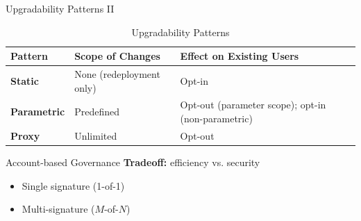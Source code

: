 \documentclass[]{beamer}
\begin{document}
\begin{frame}{Upgradability Patterns II}

	\vspace{1.5em}

	{\small
		\begin{table}[h]
			\centering
			\begin{tabular}{p{1.8cm}p{4cm}p{4.5cm}}
			\hline
			\hline
			\textbf{Pattern} & \textbf{Scope of Changes} & \textbf{Effect on Existing Users} \\
			\hline
			\textbf{Static} & None (redeployment only) & Opt-in \\
			\hline
			\textbf{Parametric} & Predefined & Opt-out (parameter scope); opt-in (non-parametric) \\
			\hline
			\textbf{Proxy} & Unlimited & Opt-out \\
			\hline
			\end{tabular}
			\caption{Upgradability Patterns \cite{schulerDefi2023}}
		\end{table}
	}
\end{frame}

\begin{frame}{Account-based Governance}
	\textbf{Tradeoff:} efficiency vs. security
	\begin{itemize}
		\item Single signature (1-of-1)
		\item Multi-signature ($M$-of-$N$)
	\end{itemize}

	\vspace{1.5em}

\end{frame}
\end{document}
